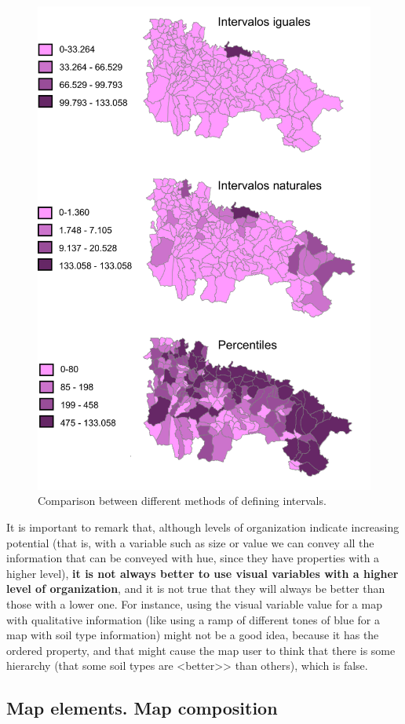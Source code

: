 \begin{itemize}
	\begin{figure}[!hbt]
	\centering
	\includegraphics[width=.7\columnwidth]{Visualization/IntervalClasses.pdf}
	\caption{\small Comparison between different methods of defining intervals.}
	\label{Fig:IntervalClasses} 
	\end{figure}


\end{itemize}


It is important to remark that, although levels of organization indicate increasing potential (that is, with a variable such as size or value we can convey all the information that can be conveyed with hue, since they have properties with a higher level), \textbf{it is not always better to use visual variables with a higher level of organization}, and it is not true that they will always be better than those with a lower one. For instance, using the visual variable value for a map with qualitative information (like using a ramp of different tones of blue for a map with soil type information) might not be a good idea, because it has the ordered property, and that might cause the map user to think that there is some hierarchy (that some soil types are <better>> than others), which is false.


\subsection{Map elements. Map composition}

